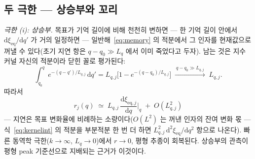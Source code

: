 \documentclass[11pt,a4paper]{article}
\newcommand{\dd}{\mathrm{d}}
\newcommand{\eq}{\mathrm{eq}}
\begin{document}
\subsection{두 극한 — 상승부와 꼬리}
\emph{극한 (i): 상승부.} 목표가 기억 길이에 비해 천천히 변하면 — 한 기억 길이 안에서
$\dd\xi_{\eq}/\dd q'$ 가 거의 일정하면 — 일반해~\eqref{eq:memory} 의 적분에서 그 인자를 현재값으로
꺼낼 수 있다(초기 지연 항은 $q-q_0\gg L_q$ 에서 이미 죽었다고 두자). 남는 것은 지수 커널 자신의
적분이라 닫힌 꼴로 평가된다:
\begin{equation}
\int_{q_0}^{q}e^{-(q-q')/L_{q,j}}\,\dd q'
=L_{q,j}\Big[1-e^{-(q-q_0)/L_{q,j}}\Big]
\;\xrightarrow{\ q-q_0\gg L_{q,j}\ }\;L_{q,j}.
\label{eq:kernelint}
\end{equation}
따라서
\begin{equation}
r_j(q)\;\simeq\;L_{q,j}\,\frac{\dd\xi_{\eq,j}}{\dd q}\bigg|_{q}\;+\;O(L_{q,j}^2)
\label{eq:risefollow}
\end{equation}
— 지연은 목표 변화율에 비례하는 소량이다($O(L^2)$ 는 꺼낸 인자의 잔여 변화 몫 — 식~\eqref{eq:kernelint}
의 적분을 부분적분 한 번 더 하면 $L_{q,j}^2\,\dd^2\xi_{\eq}/\dd q^2$ 항으로 나온다). 빠른 동역학 극한($k\to\infty$,
$L_q\to0$)에서 $r\to0$, 평형 추종이 회복된다. 상승부의 관측이 평형 peak 기준선으로 지배되는 근거가
이것이다.
\end{document}
